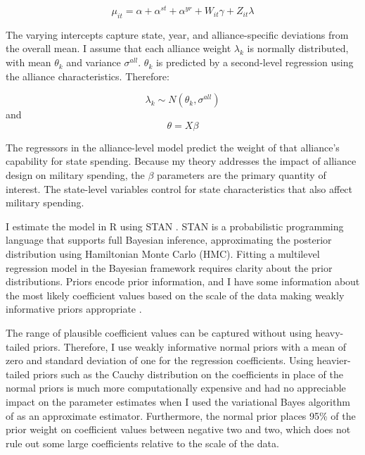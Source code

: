 \documentclass[12pt]{article}
\begin{document}
\begin{equation}
\mu_{it} = \alpha + \alpha^{st} + \alpha^{yr} + W_{it} \gamma + Z_{it} \lambda 
\end{equation}

The varying intercepts capture state, year, and alliance-specific deviations from the overall mean. I assume that each alliance weight $\lambda_k$ is normally distributed, with mean $\theta_k$ and variance $\sigma^{all}$. $\theta_k$ is predicted by a second-level regression using the alliance characteristics. Therefore:

\begin{equation}
\lambda_k \sim N(\theta_k , \sigma^{all})
\end{equation} 
and 
\begin{equation}
\theta = X \beta
\end{equation}

The regressors in the alliance-level model predict the weight of that alliance's capability for state spending. Because my theory addresses the impact of alliance design on military spending, the $\beta$ parameters are the primary quantity of interest. The state-level variables control for state characteristics that also affect military spending. 

I estimate the model in \textsf{R} using STAN \citep{Carpenteretal2016}. STAN is a probabilistic programming language that supports full Bayesian inference, approximating the posterior distribution using Hamiltonian Monte Carlo (HMC). Fitting a multilevel regression model in the Bayesian framework requires clarity about the prior distributions. Priors encode prior information, and I have some information about the most likely coefficient values based on the scale of the data making weakly informative priors appropriate \citep{Gelmanetal2014}. 

The range of plausible coefficient values can be captured without using heavy-tailed priors. Therefore, I use weakly informative normal priors with a mean of zero and standard deviation of one for the regression coefficients. Using heavier-tailed priors such as the Cauchy distribution on the coefficients in place of the normal priors is much more computationally expensive and had no appreciable impact on the parameter estimates when I used the variational Bayes algorithm of \citep{Kucukelbiretal2015} as an approximate estimator. Furthermore, the normal prior places 95\% of the prior weight on coefficient values between negative two and two, which does not rule out some large coefficients relative to the scale of the data. 
\end{document}

